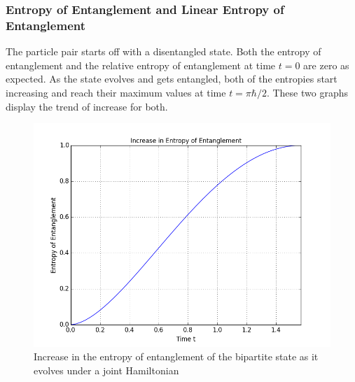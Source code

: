 \pagebreak
\subsubsection{Entropy of Entanglement and Linear Entropy of Entanglement}
The particle pair starts off with a disentangled state. Both the entropy of entanglement and the relative entropy of entanglement at time $t=0$ are zero as expected. As the state evolves and gets entangled, both of the entropies start increasing and reach their maximum values at time $t=\pi\hbar/2$. These two graphs display the trend of increase for both.

\begin{center}
\begin{figure}[H]
  \begin{center}
    \includegraphics[scale=0.62]{figures/timeevolution-01.png}
    \caption{Increase in the entropy of entanglement of the bipartite state as it evolves under a joint Hamiltonian}
    \label{fig: Time Evolution: Entropy of Entanglement}
  \end{center}
\end{figure}
\end{center}

